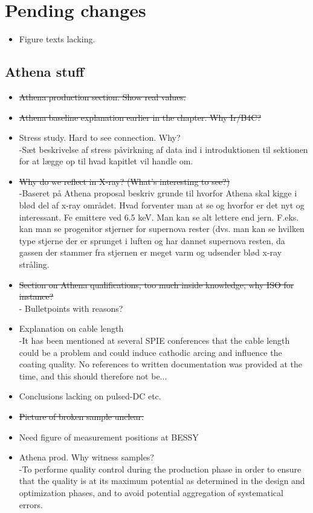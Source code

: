 \section{Pending changes}
\begin{itemize}
\item Figure texts lacking.
\end{itemize}
\subsection{Athena stuff}
\begin{itemize}

	\item \st{ Athena production section. Show real values.}
	\item \st{Athena baseline explanation earlier in the chapter. Why Ir/B4C?}
	\item Stress study. Hard to see connection. Why?\\
      -Sæt beskrivelse af stress påvirkning af data ind i introduktionen til sektionen for at lægge op til hvad kapitlet vil handle om.
	\item \st{Why do we reflect in X-ray? (What's interesting to see?)}\\
      -Baseret på Athena proposal beskriv grunde til hvorfor Athena skal kigge i blød del af x-ray området. Hvad forventer man at se og hvorfor er det nyt og interessant. Fe emittere ved 6.5 keV. Man kan se alt lettere end jern. F.eks. kan man se progenitor stjerner for supernova rester (dvs. man kan se hvilken type stjerne der er sprunget i luften og har dannet supernova resten, da gassen der stammer fra stjernen er meget varm og udsender blød x-ray stråling.
	\item \st{Section on Athena qualifications, too much inside knowledge, why ISO for instance?}\\
         - Bulletpoints with reasons?
	\item Explanation on cable length\\
      -It has been mentioned at several SPIE conferences that the cable length could be a problem and could induce cathodic arcing and influence the coating quality. No references to written documentation was provided at the time, and this should therefore not be...
	\item Conclusions lacking on pulsed-DC etc.
	\item \st{Picture of broken sample unclear.}
	\item Need figure of measurement positions at BESSY
	\item Athena prod. Why witness samples?\\
      -To performe quality control during the production phase in order to ensure that the quality is at its maximum potential as determined in the design and optimization phases, and to avoid potential aggregation of systematical errors.

\end{itemize}

